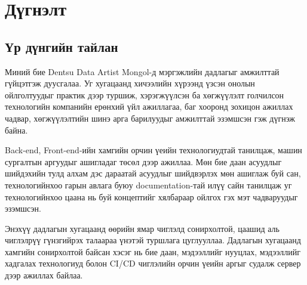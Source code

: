 \chapter{Дүгнэлт}
\section{Үр дүнгийн тайлан}
Миний бие Dentsu Data Artist Mongol-д мэргэжлийн дадлагыг
амжилттай гүйцэтгэж дуусгалаа. Уг хугацаанд хичээлийн хүрээнд үзсэн онолын ойлголтуудыг
практик дээр туршиж, хэрэгжүүлсэн ба хөгжүүлэлт голчилсон технологийн компанийн ерөнхий
үйл ажиллагаа, баг хооронд зохицон ажиллах чадвар, хөгжүүлэлтийн шинэ арга барилуудыг
амжилттай эзэмшсэн гэж дүгнэж байна.

Back-end, Front-end-ийн хамгийн орчин үеийн технологиудтай танилцаж, машин сургалтын аргуудыг ашигладаг төсөл дээр ажиллаа. Мөн бие даан асуудлыг шийдэхийн тулд алхам дэс дараатай асуудлыг шийдвэрлэх мөн ашиглаж буй сан, технологийнхоо
гарын авлага буюу documentation-тай илүү сайн танилцаж уг технологийнхоо цаана нь буй
концептийг хялбараар ойлгох гэх мэт чадваруудыг эзэмшсэн. 

Энэхүү дадлагын хугацаанд өөрийн ямар чиглэлд сонирхолтой, цаашид аль чиглэлрүү гүнзгийрэх талаараа үнэтэй туршлага цуглууллаа. Дадлагын хугацаанд хамгийн сонирхолтой байсан хэсэг нь бие даан, мэдээллийг нууцлах, мэдээллийг хадгалах технологиуд болон CI/CD чиглэлийн орчин үеийн аргыг судалж сервер дээр ажиллах байлаа.